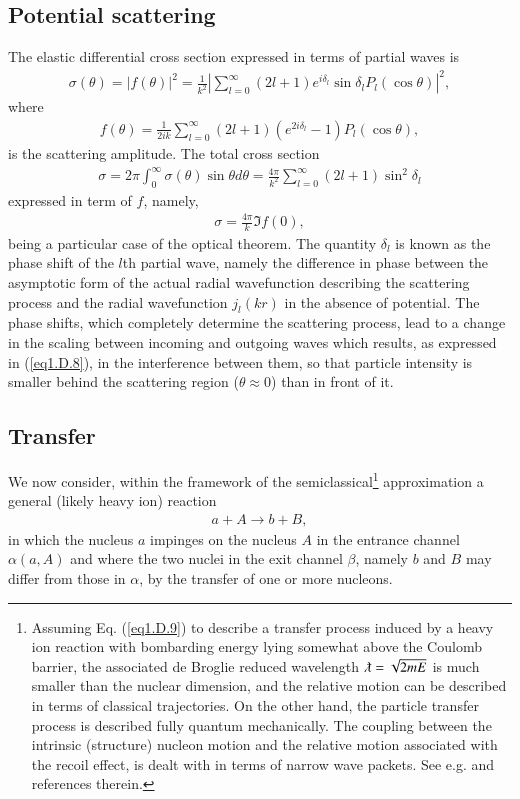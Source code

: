 \begin{subappendices}
\subsection{Potential scattering}
The elastic differential cross section expressed in terms of partial waves is
\begin{align}\label{eq1.D.5}
\sigma(\theta)=|f(\theta)|^2=\frac{1}{k^2}\left|\sum_{l=0}^\infty(2l+1)e^{i\delta_l}\sin\delta_lP_l(\cos\theta)\right|^2,
\end{align}
where
\begin{align}\label{eq1.D.6}
f(\theta)=\frac{1}{2ik}\sum_{l=0}^\infty(2l+1)\left(e^{2i\delta_l}-1\right) P_l(\cos\theta),
\end{align}
is the scattering amplitude. The total cross section 
\begin{align}\label{eq1.D.7}
\sigma=2\pi\int_0^\infty\sigma(\theta)\sin\theta d\theta=\frac{4\pi}{k^2}\sum_{l=0}^\infty(2l+1)\sin^2\delta_l
\end{align}
expressed in term of $f$, namely,
\begin{align}\label{eq1.D.8}
\sigma=\frac{4\pi}{k}\Im f(0),
\end{align}
being a particular case of the optical theorem. The quantity $\delta_l$ is known as the phase shift of the $l$th partial wave, namely the difference in phase between the asymptotic form of the actual radial wavefunction describing the scattering process and the radial wavefunction $j_l(kr)$ in the absence of potential. The phase shifts, which completely determine the scattering process, lead to a change in the scaling between incoming and outgoing waves which results, as expressed in (\ref{eq1.D.8}), in the interference between them, so that particle intensity is smaller behind the scattering region ($\theta\approx0$) than in front of it. 
\subsection{Transfer}\label{S2B2}
We now consider, within the framework of the semiclassical\footnote{Assuming Eq. (\ref{eq1.D.9}) to describe a transfer process induced by a heavy ion reaction with bombarding energy lying somewhat above the Coulomb barrier, the associated de Broglie reduced wavelength $\lambdabar=\sqrt{2mE}$ is much smaller than the nuclear dimension, and the relative motion can be described in terms of classical trajectories. On the other hand, the particle transfer process is described fully quantum mechanically. The coupling between the intrinsic (structure) nucleon motion and the relative motion associated with the recoil effect, is dealt with in terms of narrow wave packets. See e.g. \cite{Broglia:04a} and references therein.} approximation a general (likely heavy ion) reaction
\begin{align}\label{eq1.D.9}
a+A\rightarrow b+B,
\end{align}
in which the nucleus $a$ impinges on the nucleus $A$ in the entrance channel $\alpha(a,A)$ and where the two nuclei in the exit channel $\beta$, namely $b$ and $B$ may differ from those in $\alpha$, by the transfer of one or more nucleons.





\end{subappendices}
